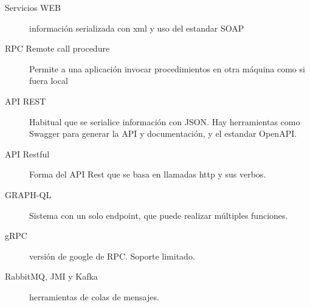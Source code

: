     \begin{description}
        \item[Servicios WEB] información serializada con xml y uso del estandar SOAP
        \item[RPC Remote call procedure] Permite a una aplicación invocar procedimientos en otra máquina como si fuera local
        \item[API REST] Habitual que se serialice información con JSON. Hay herramientas como Swagger para generar la API y documentación, y el estandar OpenAPI.
        \item[API Restful] Forma del API Rest que se basa en llamadas http y sus verbos.
        \item[GRAPH-QL] Sistema con un solo endpoint, que puede realizar múltiples funciones.
        \item[gRPC] versión de google de RPC. Soporte limitado.
        \item[RabbitMQ, JMI y Kafka] herramientas de colas de mensajes.
    \end{description}
